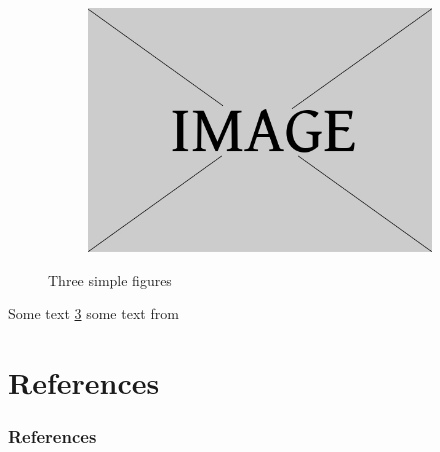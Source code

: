 \documentclass[aspectratio=169, serif ]{beamer}
\begin{document}
\begin{frame}
\begin{figure}
\begin{subfigure}[b]{0.3\textwidth}
         \caption{}
         \label{fig:b}
     \end{subfigure}
     \hfill
     \begin{subfigure}[b]{0.3\textwidth}
         \centering
         \includegraphics[width=\textwidth]{Figures/example.jpg}
         \caption{}
         \label{fig:c}
     \end{subfigure}
        \caption{Three simple figures}
        \label{fig:three graphs}
    \end{figure}
    Some text \ref{fig:three graphs} some text from \cite{newton1952opticks}
\end{frame}


\section{References}
\begin{frame}
 \frametitle{\textcolor{BrightYellow}{References}}
 
    
    { \fontsize{7}{10}\selectfont
    
    }
\end{frame}
\end{document}
